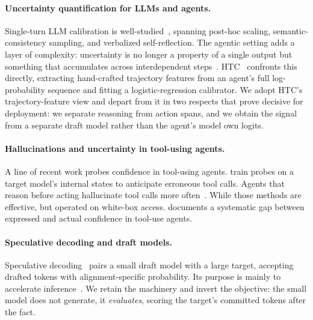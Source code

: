 \documentclass[11pt]{article}
\begin{document}
\paragraph{Uncertainty quantification for LLMs and agents.}
Single-turn LLM calibration is well-studied~\citep{guo2017calibration, geng2024survey, kuhn2023semantic, lin2023generating}, spanning post-hoc
scaling, semantic-consistency sampling, and verbalized self-reflection. The agentic setting adds a layer of complexity: uncertainty is no longer a property of a single output but
something that accumulates across interdependent steps~\citep{zhang2025htc, duan2025uprop, zhao2024saup}.
HTC~\citep{zhang2025htc} confronts this directly, extracting hand-crafted trajectory features
from an agent's full log-probability sequence and fitting a logistic-regression calibrator. We
adopt HTC's trajectory-feature view and depart from it in two respects that prove decisive for
deployment: we separate reasoning from action spans, and we obtain the signal from a separate
draft model rather than the agent's model own logits.

\paragraph{Hallucinations and uncertainty in tool-using agents.}
A line of recent work probes confidence in tool-using agents.
\citet{internal_tool_selection, mice_for_cats} train probes on a target model's internal states to anticipate erroneous
tool calls. Agents that reason before acting hallucinate tool calls more often~\citep{yin2025reasoning}. While those methods are effective, but operated on white-box access. \citet{confidence_dichotomy, agentic_overconfidence} documents a
systematic gap between expressed and actual confidence in tool-use agents.  

\paragraph{Speculative decoding and draft models.}
Speculative decoding~\citep{leviathan2023fast, chen2023accelerating} pairs a small draft
model with a large target, accepting drafted tokens with alignment-specific probability. Its purpose is mainly to accelerate inference~\citep{xia2024unlocking, leviathan2023fast}. We
retain the machinery and invert the objective: the small model does not generate, it
\emph{evaluates}, scoring the target's committed tokens after the fact.

\end{document}
